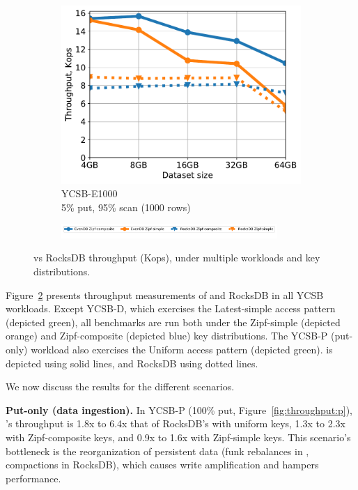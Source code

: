 \begin{figure}[tb]
\begin{subfigure}{0.33\linewidth}
\includegraphics[width=\textwidth]{figs/Workload_E+_line.pdf}
\caption{YCSB-E1000 \\5\% put, 95\% scan (1000 rows)}
\label{fig:throughput:e1000}
\end{subfigure}
\begin{subfigure}{\linewidth}
\centerline{
\includegraphics[width=0.9\textwidth]{figs/legend.pdf}
\vspace{-5mm}
}
\end{subfigure}
\caption{
{\sys\/ vs RocksDB throughput (Kops), under multiple workloads and key distributions.}
}
\label{fig:throughput}
\end{figure}

Figure~\ref{fig:throughput} presents throughput measurements of \sys\/ and RocksDB
in all YCSB workloads. Except YCSB-D, which exercises the Latest-simple access pattern
(depicted green), all benchmarks are run both under the Zipf-simple (depicted orange) 
and Zipf-composite (depicted blue) key distributions. The YCSB-P (put-only) workload 
also exercises the Uniform access pattern (depicted green). \sys\/ is depicted using solid
lines, and RocksDB using dotted lines. 

We now discuss the results for the different scenarios.

  
{\bf Put-only (data ingestion).} 
In {YCSB-P} (100\% put, Figure~\ref{fig:throughput:p}), 
\sys's throughput is 1.8x to 6.4x that of RocksDB's with uniform keys, 1.3x to 2.3x with Zipf-composite keys, 
and 0.9x to 1.6x with Zipf-simple keys. This scenario's bottleneck is the reorganization of persistent data  
(funk rebalances in \sys, compactions in RocksDB), which causes write amplification and hampers performance. 
 
